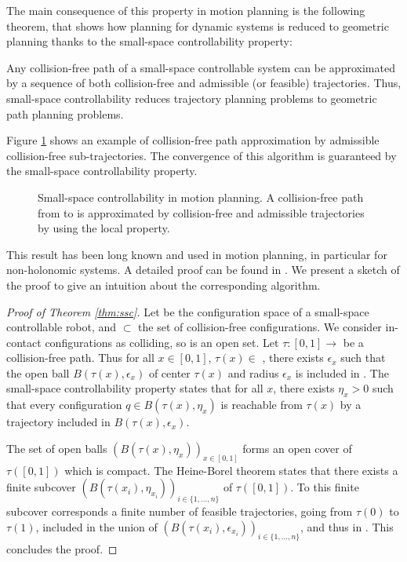 The main consequence of this property in motion planning is the
following theorem, that shows how planning for dynamic systems is
reduced to geometric planning thanks to the small-space
controllability property:

\begin{theorem}
  \label{thm:ssc}
  Any collision-free path of a small-space controllable system can be
  approximated by a sequence of both collision-free and admissible (or
  feasible) trajectories. Thus, small-space controllability reduces
  trajectory planning problems to geometric path planning problems.
\end{theorem}

Figure \ref{fig:ssc2} shows an example of collision-free path
approximation by admissible collision-free sub-trajectories. The
convergence of this algorithm is guaranteed by the small-space
controllability property.

\begin{figure}
  \centering

  

  \caption{Small-space controllability in motion planning. 
    A collision-free path from
     to  is approximated by collision-free and admissible
    trajectories by using the local property.
  }
  \label{fig:ssc2}
\end{figure}

This result has been long known and used in motion planning, in
particular for non-holonomic systems. A detailed proof can be found in
\cite{taix-94}. We present a sketch of the proof to give an intuition
about the corresponding algorithm.

\begin{proof}[Proof of Theorem \ref{thm:ssc}]
  Let {\cspace} be the configuration space of a small-space
  controllable robot, and {\cfree} $\subset$ {\cspace}
  the set of collision-free configurations. We consider in-contact
  configurations as colliding, so {\cfree} is an open set.
  Let $\tau : [0,1] \rightarrow $ {\cfree} be a collision-free
  path. Thus for all $x \in [0,1]$, $\tau(x) \in $ {\cfree},
  there exists $\epsilon_x$ such that the open ball
  $B(\tau(x),\epsilon_x)$ of center $\tau(x)$ and radius $\epsilon_x$
  is included in \cfree. The small-space controllability property
  states that for all $x$, there exists $\eta_x > 0$ such that every
  configuration $q \in B(\tau(x),\eta_x)$ is reachable from $\tau(x)$
  by a trajectory included in $B(\tau(x),\epsilon_x)$.

  The set of open balls $\left( B(\tau(x),\eta_x) \right)_{x\in
    [0,1]}$ forms an open cover of $\tau([0,1])$ which is compact. The
  Heine-Borel theorem \cite{fitzpatrick2006advanced} states that there
  exists a finite subcover $\left( B(\tau(x_i),\eta_{x_i})
  \right)_{i\in \{ 1,\dots ,n \}}$ of $\tau([0,1])$. To this finite
  subcover corresponds a finite number of feasible trajectories, going
  from $\tau(0)$ to $\tau(1)$, included in the union of $\left(
  B(\tau(x_i),\epsilon_{x_i}) \right)_{i\in \{ 1,\dots ,n \}}$, and
  thus in \cfree. This concludes the proof.
\end{proof}


